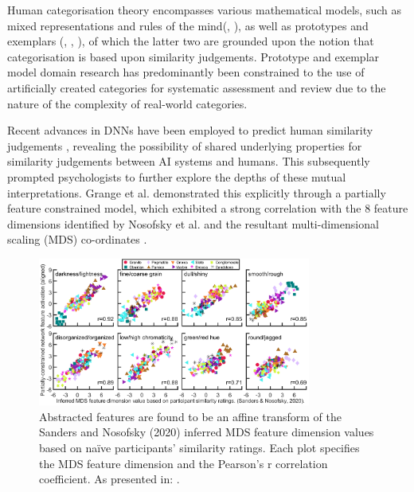 Human categorisation theory encompasses various mathematical models, such as mixed representations and rules of the mind(\cite{ashbyNeuropsychologicalTheoryMultiple1998}, \cite{ericksonRulesExemplarsCategory1996}), as well as prototypes \cite{smithThirtyCategorizationResults2000} and exemplars (\cite{nosofskyAttentionSimilarityIdentificationCategorization1986a}, \cite{medinContextTheoryClassification1978}, \cite{kruschkeALCOVEExemplarBasedConnectionist1992}), of which the latter two are grounded upon the notion that categorisation is based upon similarity judgements. Prototype and exemplar model domain research has predominantly been constrained to the use of artificially created categories for systematic assessment and review due to the nature of the complexity of real-world categories. 

Recent advances in DNNs have been employed to predict human similarity judgements \cite{sandersTrainingDeepNetworks2020}, revealing the possibility of shared underlying properties for similarity judgements between AI systems and humans. This subsequently prompted psychologists to further explore the depths of these mutual interpretations. Grange et al. demonstrated this explicitly through a partially feature constrained model, which exhibited a strong correlation with the 8 feature dimensions identified by Nosofsky et al. \cite{miyatsuFeatureHighlightingEnhances2019} and the resultant multi-dimensional scaling (MDS) co-ordinates \cite{sandersTrainingDeepNetworks2020}.

\begin{figure}[H]
  \centering
    \includegraphics[width=0.8\textwidth]{images/KES2022- MDSvsNetwork Final.PNG}
  \caption{Abstracted features are found to be an affine transform of the Sanders and Nosofsky (2020) inferred MDS feature dimension values based on naïve participants’ similarity ratings. Each plot specifies the MDS feature dimension and the Pearson’s r correlation coefficient. As presented in: \cite{grangeXAISelfexplanatoryAI2022}.}\label{fig:AffineTransform}
\end{figure}

